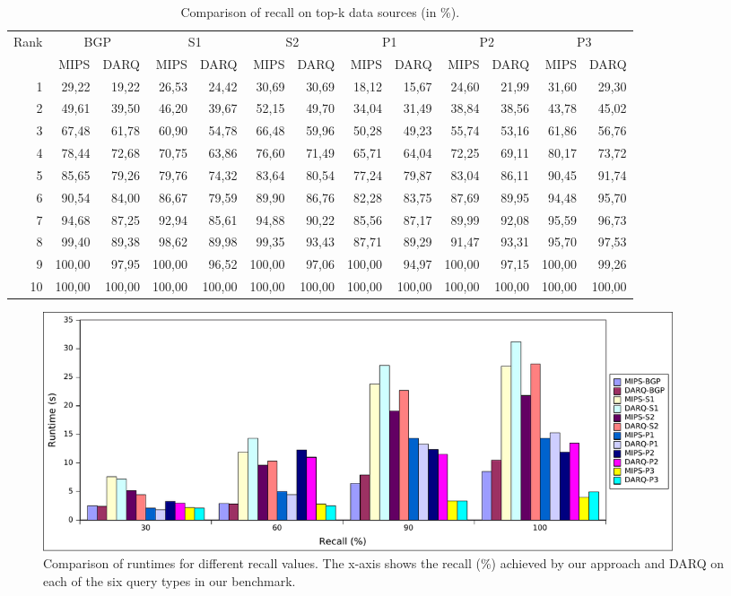 \documentclass{sig-alternate}  %
\begin{document}
\begin{table}
\centering
\begin{tabular}{rrrrrrrrrrrrr}
\hline
Rank		 & \multicolumn{2}{c}{BGP}	& \multicolumn{2}{c}{S1}	&\multicolumn{2}{c}{S2}	&\multicolumn{2}{c}{P1}	& \multicolumn{2}{c}{P2}	& \multicolumn{2}{c}{P3} \\
	& MIPS & DARQ & MIPS & DARQ & MIPS & DARQ & MIPS & DARQ & MIPS & DARQ & MIPS & DARQ \\\hline
1 & 29,22 & 19,22 & 26,53 & 24,42 & 30,69 & 30,69 & 18,12 & 15,67 & 24,60 & 21,99 & 31,60 & 29,30 \\
2 & 49,61 & 39,50 & 46,20 & 39,67 & 52,15 & 49,70 & 34,04 & 31,49 & 38,84 & 38,56 & 43,78 & 45,02 \\
3 & 67,48 & 61,78 & 60,90 & 54,78 & 66,48 & 59,96 & 50,28 & 49,23 & 55,74 & 53,16 & 61,86 & 56,76 \\
4 & 78,44 & 72,68 & 70,75 & 63,86 & 76,60 & 71,49 & 65,71 & 64,04 & 72,25 & 69,11 & 80,17 & 73,72\\
5 & 85,65 & 79,26 & 79,76 & 74,32 & 83,64 & 80,54 & 77,24 & 79,87 & 83,04 & 86,11 & 90,45 & 91,74\\
6 & 90,54 & 84,00 & 86,67 & 79,59 & 89,90 & 86,76 & 82,28 & 83,75 & 87,69 & 89,95 & 94,48 & 95,70\\
7 & 94,68 & 87,25 & 92,94 & 85,61 & 94,88 & 90,22 & 85,56 & 87,17 & 89,99 & 92,08 & 95,59 & 96,73\\
8 & 99,40 & 89,38 & 98,62 & 89,98 & 99,35 & 93,43 & 87,71 & 89,29 & 91,47 & 93,31 & 95,70 & 97,53\\
9 & 100,00& 97,95 & 100,00& 96,52 & 100,00& 97,06 & 100,00& 94,97 & 100,00& 97,15 & 100,00& 99,26\\
10& 100,00& 100,00& 100,00& 100,00& 100,00& 100,00& 100,00& 100,00& 100,00& 100,00& 100,00& 100,00\\\hline
\end{tabular}
\caption{Comparison of recall on top-k data sources (in \%).}
\label{tab:recall}
\end{table}

\begin{figure}
\begin{centering}
\includegraphics[width = 0.9\textwidth]{img/runtime_recall} 
\par\end{centering}
\caption{Comparison of runtimes for different recall values. The x-axis shows the recall (\%) achieved by our approach and DARQ on each of the six query types in our benchmark. }
\label{fig:runtime_recall}
\end{figure}
\end{document}
